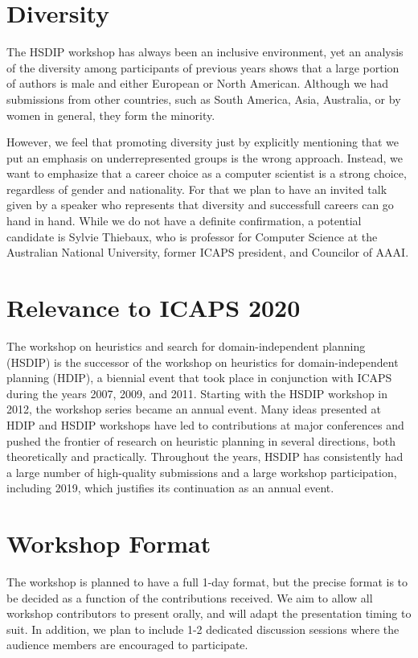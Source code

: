 \documentclass[10pt]{article}
\begin{document}
\section*{Diversity}
The HSDIP workshop has always been an inclusive environment, yet an analysis
of the diversity among participants of previous years shows that a large portion
of authors is male and either European or North American. Although we had
submissions from other countries, such as South America, Asia, Australia, or
by women in general, they form the minority.

However, we feel that promoting diversity just by explicitly mentioning that we
put an emphasis on underrepresented groups is the wrong approach. Instead, we
want to emphasize that a career choice as a computer scientist is a strong choice,
regardless of gender and nationality. For that we plan to have an invited talk
given by a speaker who represents that diversity and successfull careers can go
hand in hand.  While we do not have a definite confirmation, a potential
candidate is Sylvie Thiebaux, who is professor for Computer Science at the
Australian National University, former ICAPS president, and Councilor of AAAI.


\section*{Relevance to ICAPS 2020}

The workshop on heuristics and search for domain-independent planning (HSDIP) is
the successor of the workshop on heuristics for domain-independent planning
(HDIP), a biennial event that took place in conjunction with ICAPS during the
years 2007, 2009, and 2011. Starting with the HSDIP workshop in 2012, the
workshop series became an annual event.
Many ideas presented at HDIP and HSDIP workshops have led to contributions at
major conferences and pushed the frontier of research on heuristic planning in
several directions, both theoretically and practically.
Throughout the years, HSDIP has consistently had a large number of
high-quality submissions and a large workshop participation, including 2019,
which justifies its continuation as an annual event.

\section*{Workshop Format}

The workshop is planned to have a full 1-day format, but the precise
format is to be decided as a function of the contributions received.
We aim to allow all workshop contributors to present orally, and will
adapt the presentation timing to suit. In addition, we plan to include
1-2 dedicated discussion sessions where the audience members are
encouraged to participate.
\end{document}
